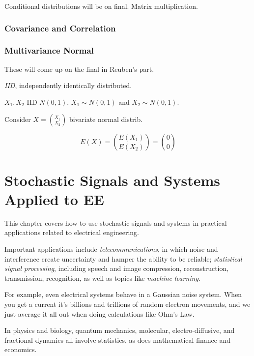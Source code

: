\documentclass{report}
\begin{document}
Conditional distributions will be on final. Matrix multiplication.

\subsection{Covariance and Correlation}



\subsection{Multivariance Normal}

These will come up on the final in Reuben's part.

\textit{IID}, independently identically distributed.

$X_1, X_2$ IID $N(0,1)$. $X_1 \sim N(0,1)$ and $X_2 \sim N(0,1)$.

Consider $X = {X_1 \choose X_2}$ bivariate normal distrib. 

$$E(X) = {E(X_1) \choose E(X_2)} = {0 \choose 0}$$

















\chapter{Stochastic Signals and Systems Applied to EE}

\newpage


This chapter covers how to use stochastic signals and systems in practical applications related to electrical engineering. 

Important applications include \textit{telecommunications}, in which noise and interference create uncertainty and hamper the ability to be reliable; \textit{statistical signal processing}, including speech and image compression, reconstruction, transmission, recognition, as well as topics like \textit{machine learning}. 

For example, even electrical systems behave in a Gaussian noise system. When you get a current it's billions and trillions of random electron movements, and we just average it all out when doing calculations like Ohm's Law.

In physics and biology, quantum mechanics, molecular, electro-diffusive, and fractional dynamics all involve statistics, as does mathematical finance and economics.
\end{document}
